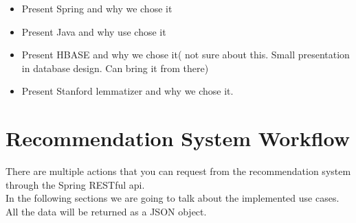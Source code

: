 \begin{itemize}
	\item Present Spring and why we chose it	
	\item Present Java and why use chose it
	\item Present HBASE and why we chose it( not sure about this. Small presentation in database design. Can bring it from there)
	\item Present Stanford lemmatizer and why we chose it.	
\end{itemize}


\section{Recommendation System Workflow} 
\label{sec:workflow}
There are multiple actions that you can request from the recommendation system through the Spring RESTful api.
\\ In the following sections we are going to talk about the implemented use cases.
\\ All the data will be returned as a JSON object.

\hfill \break
\hfill \break
\hfill \break
\hfill \break

